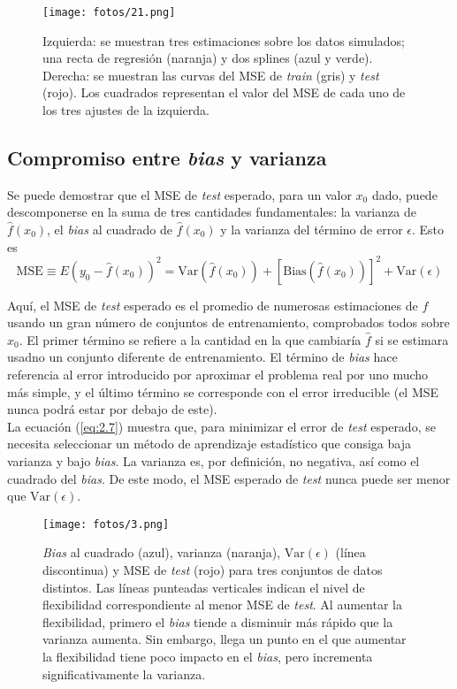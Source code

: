 \begin{figure}[h]
\centering
\texttt{[image: fotos/21.png]}
\caption{Izquierda: se muestran tres estimaciones sobre los datos simulados; una recta de regresión (naranja) y dos splines (azul y verde). Derecha: se muestran las curvas del MSE de \textit{train} (gris) y \textit{test} (rojo). Los cuadrados representan el valor del MSE de cada uno de los tres ajustes de la izquierda.}
\label{fig:4.1}
\end{figure}

\subsection{Compromiso entre \textit{bias} y varianza}

Se puede demostrar que el MSE de \textit{test} esperado, para un valor $x_0$ dado, puede descomponerse en la suma de tres cantidades fundamentales: la varianza de $\hat{f}(x_0)$, el \textit{bias} al cuadrado de $\hat{f}(x_0)$ y la varianza del término de error $\epsilon$. Esto es 
\begin{equation}
\text{MSE} \equiv E(y_0 - \hat{f}(x_0))^2 = \text{Var}(\hat{f}(x_0)) + [\text{Bias}(\hat{f}(x_0))]^2 + \text{Var}(\epsilon)
\label{eq:2.7}
\end{equation}

Aquí, el MSE de \textit{test} esperado es el promedio de numerosas estimaciones de $f$ usando un gran número de conjuntos de entrenamiento, comprobados todos sobre $x_0$. El primer término se refiere a la cantidad en la que cambiaría $\hat{f}$ si se estimara usadno un conjunto diferente de entrenamiento. El término de \textit{bias} hace referencia al error introducido por aproximar el problema real por uno mucho más simple, y el último término se corresponde con el error irreducible (el MSE nunca podrá estar por debajo de este). \\

La ecuación (\ref{eq:2.7}) muestra que, para minimizar el error de \textit{test} esperado, se necesita seleccionar un método de aprendizaje estadístico que consiga baja varianza y bajo \textit{bias}. La varianza es, por definición, no negativa, así como el cuadrado del \textit{bias}. De este modo, el MSE esperado de \textit{test} nunca puede ser menor que $\text{Var}(\epsilon)$. \\

\begin{figure}[h]
\centering
\texttt{[image: fotos/3.png]}
\caption{\textit{Bias} al cuadrado (azul), varianza (naranja), $\text{Var}(\epsilon)$ (línea discontinua) y MSE de \textit{test} (rojo) para tres conjuntos de datos distintos. Las líneas punteadas verticales indican el nivel de flexibilidad correspondiente al menor MSE de \textit{test}. Al aumentar la flexibilidad, primero el \textit{bias} tiende a disminuir más rápido que la varianza aumenta. Sin embargo, llega un punto en el que aumentar la flexibilidad tiene poco impacto en el \textit{bias}, pero incrementa significativamente la varianza.}
\label{fig:3}
\end{figure}

